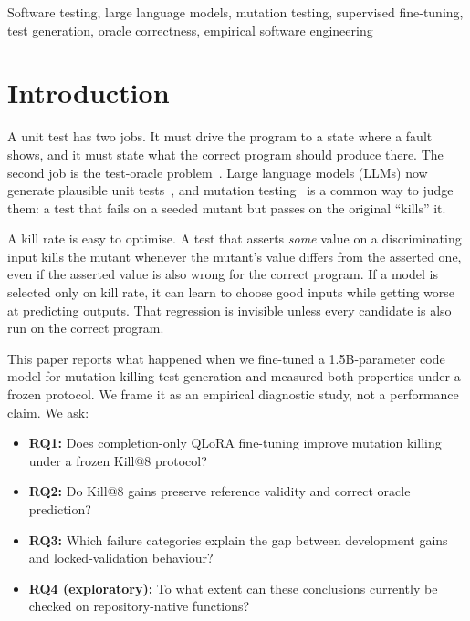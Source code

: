 \documentclass[conference,a4paper]{IEEEtran}
\makeatletter
\newcommand{\killk}[1]{Kill@#1}
\makeatother
\begin{document}
\begin{IEEEkeywords}
Software testing, large language models, mutation testing, supervised fine-tuning,
test generation, oracle correctness, empirical software engineering
\end{IEEEkeywords}

\section{Introduction}

A unit test has two jobs. It must drive the program to a state where a fault shows,
and it must state what the correct program should produce there. The second job is the
test-oracle problem~\cite{barr2015oracle}. Large language models (LLMs) now generate
plausible unit tests~\cite{schafer2024llmunit,lemieux2023codamosa,wang2024testingsurvey},
and mutation testing~\cite{jia2011mutation,papadakis2019mutation} is a common way to
judge them: a test that fails on a seeded mutant but passes on the original
``kills'' it.

A kill rate is easy to optimise. A test that asserts \emph{some} value on a
discriminating input kills the mutant whenever the mutant's value differs from the
asserted one, even if the asserted value is also wrong for the correct program. If a
model is selected only on kill rate, it can learn to choose good inputs while getting
worse at predicting outputs. That regression is invisible unless every candidate is
also run on the correct program.

This paper reports what happened when we fine-tuned a 1.5B-parameter code model for
mutation-killing test generation and measured both properties under a frozen
protocol. We frame it as an empirical diagnostic study, not a performance claim. We ask:

\begin{itemize}
\item \textbf{RQ1:} Does completion-only QLoRA fine-tuning improve mutation killing
under a frozen \killk{8} protocol?
\item \textbf{RQ2:} Do \killk{8} gains preserve reference validity and correct
oracle prediction?
\item \textbf{RQ3:} Which failure categories explain the gap between development
gains and locked-validation behaviour?
\item \textbf{RQ4 (exploratory):} To what extent can these conclusions currently be
checked on repository-native functions?
\end{itemize}
\end{document}
